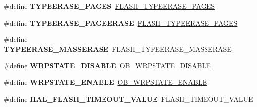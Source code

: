 \begin{DoxyCompactItemize}
\item 
\hypertarget{group___h_a_l___f_l_a_s_h___aliased___defines_ga07a98a770e73711be26d0c9bef1c174c}{\#define {\bfseries T\-Y\-P\-E\-E\-R\-A\-S\-E\-\_\-\-P\-A\-G\-E\-S}~\hyperlink{group___f_l_a_s_h_ex___type___erase_ga3664ce55155ec4990873c51737d787ce}{F\-L\-A\-S\-H\-\_\-\-T\-Y\-P\-E\-E\-R\-A\-S\-E\-\_\-\-P\-A\-G\-E\-S}}\label{group___h_a_l___f_l_a_s_h___aliased___defines_ga07a98a770e73711be26d0c9bef1c174c}

\item 
\hypertarget{group___h_a_l___f_l_a_s_h___aliased___defines_ga75bd0c1de85562b5ca5369a7bb8d99d1}{\#define {\bfseries T\-Y\-P\-E\-E\-R\-A\-S\-E\-\_\-\-P\-A\-G\-E\-E\-R\-A\-S\-E}~\hyperlink{group___f_l_a_s_h_ex___type___erase_ga3664ce55155ec4990873c51737d787ce}{F\-L\-A\-S\-H\-\_\-\-T\-Y\-P\-E\-E\-R\-A\-S\-E\-\_\-\-P\-A\-G\-E\-S}}\label{group___h_a_l___f_l_a_s_h___aliased___defines_ga75bd0c1de85562b5ca5369a7bb8d99d1}

\item 
\hypertarget{group___h_a_l___f_l_a_s_h___aliased___defines_gad155d920d19e0d37f71a46dce3227209}{\#define {\bfseries T\-Y\-P\-E\-E\-R\-A\-S\-E\-\_\-\-M\-A\-S\-S\-E\-R\-A\-S\-E}~F\-L\-A\-S\-H\-\_\-\-T\-Y\-P\-E\-E\-R\-A\-S\-E\-\_\-\-M\-A\-S\-S\-E\-R\-A\-S\-E}\label{group___h_a_l___f_l_a_s_h___aliased___defines_gad155d920d19e0d37f71a46dce3227209}

\item 
\hypertarget{group___h_a_l___f_l_a_s_h___aliased___defines_gafa6275edfe88cfcc063761a6394e475a}{\#define {\bfseries W\-R\-P\-S\-T\-A\-T\-E\-\_\-\-D\-I\-S\-A\-B\-L\-E}~\hyperlink{group___f_l_a_s_h_ex___w_r_p___state_gaa34eb6205fe554f65a311ee974d5a4ab}{O\-B\-\_\-\-W\-R\-P\-S\-T\-A\-T\-E\-\_\-\-D\-I\-S\-A\-B\-L\-E}}\label{group___h_a_l___f_l_a_s_h___aliased___defines_gafa6275edfe88cfcc063761a6394e475a}

\item 
\hypertarget{group___h_a_l___f_l_a_s_h___aliased___defines_ga1a6d2287155d773e15bb4e5561913171}{\#define {\bfseries W\-R\-P\-S\-T\-A\-T\-E\-\_\-\-E\-N\-A\-B\-L\-E}~\hyperlink{group___f_l_a_s_h_ex___w_r_p___state_ga9fc463145ab57616baa36d95523186a1}{O\-B\-\_\-\-W\-R\-P\-S\-T\-A\-T\-E\-\_\-\-E\-N\-A\-B\-L\-E}}\label{group___h_a_l___f_l_a_s_h___aliased___defines_ga1a6d2287155d773e15bb4e5561913171}

\item 
\hypertarget{group___h_a_l___f_l_a_s_h___aliased___defines_ga0c295495be438d4092e29488ac3ee897}{\#define {\bfseries H\-A\-L\-\_\-\-F\-L\-A\-S\-H\-\_\-\-T\-I\-M\-E\-O\-U\-T\-\_\-\-V\-A\-L\-U\-E}~F\-L\-A\-S\-H\-\_\-\-T\-I\-M\-E\-O\-U\-T\-\_\-\-V\-A\-L\-U\-E}\label{group___h_a_l___f_l_a_s_h___aliased___defines_ga0c295495be438d4092e29488ac3ee897}


\end{DoxyCompactItemize}
